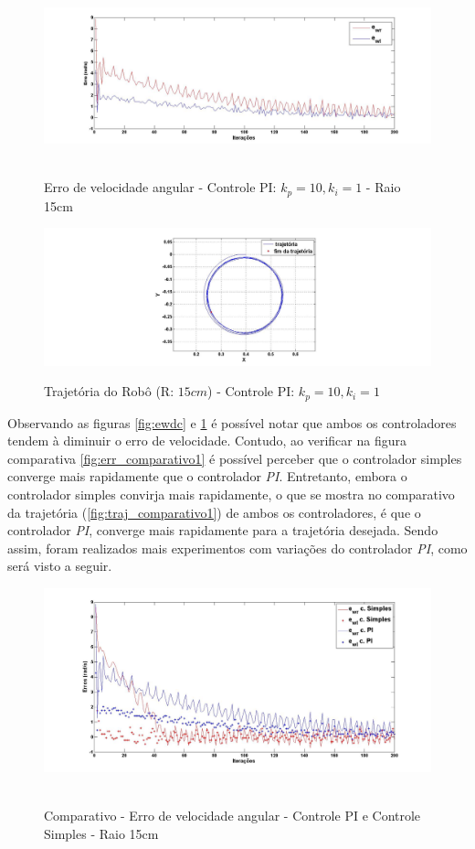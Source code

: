 \begin{figure}[!htb]
	\centering
	\caption{Erro de velocidade angular - Controle PI: $k_{p}=10,k_{i}=1$ - Raio 15cm}
	\includegraphics[width=1.0\textwidth]{./04-figuras/Ewd_b1_pi_15}
	\
	\label{fig:ewd_pi_15}
\end{figure}

\begin{figure}[!htb]
	\centering
	\caption{Trajetória do Robô (R: $15cm$) - Controle PI: $k_{p}=10,k_{i}=1$}
	\includegraphics[width=1.0\textwidth]{./04-figuras/trajetoria_b1_15_pi}
	\label{fig:traj_pi_15}
\end{figure}

Observando as figuras \ref{fig:ewdc} e \ref{fig:ewd_pi_15} é possível notar que ambos os controladores tendem à diminuir o erro de velocidade. Contudo, ao verificar na figura comparativa \autoref{fig:err_comparativo1} é possível perceber que o controlador simples converge mais rapidamente que o controlador \emph{PI}. Entretanto, embora  o controlador simples convirja mais rapidamente, o que se mostra no comparativo da trajetória (\autoref{fig:traj_comparativo1}) de ambos os controladores, é que o controlador \emph{PI}, converge mais rapidamente para a trajetória desejada. Sendo assim, foram realizados mais experimentos com variações do controlador \emph{PI}, como será visto a seguir. 

\begin{figure}[!htb]
	\centering
	\caption{Comparativo - Erro de velocidade angular - Controle PI e Controle Simples - Raio 15cm}
	\includegraphics[width=1.0\textwidth]{./04-figuras/ew_comparativo1}
	\
	\label{fig:err_comparativo1}
\end{figure}

